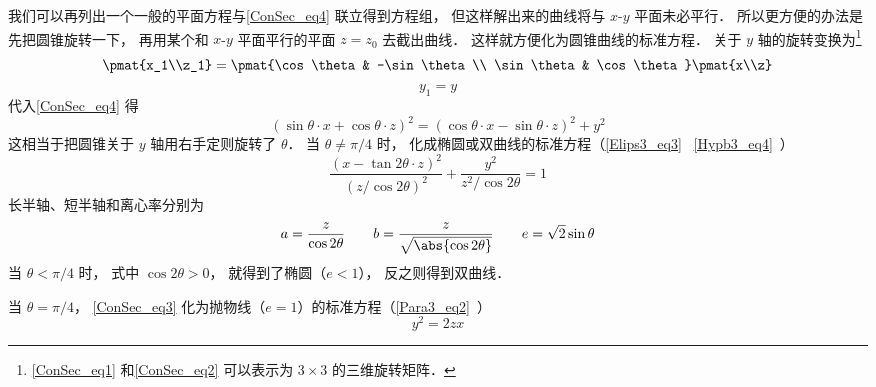 我们可以再列出一个一般的平面方程与\autoref{ConSec_eq4} 联立得到方程组， 但这样解出来的曲线将与 $x$-$y$ 平面未必平行． 所以更方便的办法是先把圆锥旋转一下， 再用某个和 $x$-$y$ 平面平行的平面 $z = z_0$ 去截出曲线． 这样就方便化为圆锥曲线的标准方程． 关于 $y$ 轴的旋转变换为\footnote{\autoref{ConSec_eq1} 和\autoref{ConSec_eq2} 可以表示为 $3\times 3$ 的三维旋转矩阵．}
\begin{equation}\label{ConSec_eq1}
\pmat{x_1\\z_1} = \pmat{\cos\theta & -\sin\theta\\ \sin\theta & \cos\theta}\pmat{x\\z}
\end{equation}
\begin{equation}\label{ConSec_eq2}
y_1 = y
\end{equation}
代入\autoref{ConSec_eq4} 得
\begin{equation}\label{ConSec_eq3}
(\sin\theta\cdot x + \cos\theta\cdot z)^2 = (\cos\theta\cdot x - \sin\theta\cdot z)^2 + y^2
\end{equation}
这相当于把圆锥关于 $y$ 轴用右手定则旋转了 $\theta$． 当 $\theta \ne \pi/4$ 时， 化成椭圆或双曲线的标准方程（\autoref{Elips3_eq3}~ \autoref{Hypb3_eq4}~）
\begin{equation}
\frac{(x - \tan2\theta \cdot z)^2}{(z/\cos2\theta)^2} + \frac{y^2}{z^2/\cos2\theta} = 1
\end{equation}
长半轴、短半轴和离心率分别为
\begin{equation}
a = \frac{z}{\cos2\theta}
\qquad
b = \frac{z}{\sqrt{\abs{\cos2\theta}}}
\qquad
e = \sqrt{2}\sin\theta
\end{equation}
当 $\theta < \pi/4$ 时， 式中 $\cos2\theta > 0$， 就得到了椭圆（$e < 1$）， 反之则得到双曲线．

当 $\theta = \pi/4$， \autoref{ConSec_eq3} 化为抛物线（$e = 1$）的标准方程（\autoref{Para3_eq2}~）
\begin{equation}
y^2 = 2zx
\end{equation}
